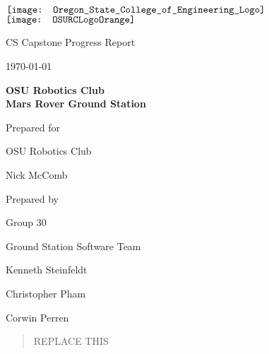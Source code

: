 \documentclass[onecolumn, draftclsnofoot, 10pt, compsoc]{IEEEtran}
\def \CapstoneTeamName{			Ground Station Software Team}
\def \CapstoneTeamNumber{		30}
\def \GroupMemberOne{			Kenneth Steinfeldt}
\def \GroupMemberTwo{			Christopher Pham}
\def \GroupMemberThree{			Corwin Perren}
\def \CapstoneProjectName{		OSU Robotics Club\\Mars Rover Ground Station}
\def \CapstoneSponsorCompany{	OSU Robotics Club}
\def \CapstoneSponsorPerson{	Nick McComb}
\def \DocType{	%
				Progress Report
			 }
\newcommand{\NameSigPair}[1]{
  \par
  \makebox[2.75in][r]{#1} 
  \hfill
  \makebox[3.25in]{
      \makebox[2.25in]{\hrulefill} 
      \hfill
      \makebox[.75in]{\hrulefill}
  }
  \par\vspace{-12pt} 
  \textit{
      \tiny\noindent
      \makebox[2.75in]{} 
      \hfill
      \makebox[3.25in]{
          \makebox[2.25in][r]{Signature} 
          \hfill
          \makebox[.75in][r]{Date}
      }
  }
}
\renewcommand{\NameSigPair}[1]{#1}
\begin{document}
\begin{titlepage}
	\begin{singlespace}
        \begin{minipage}{7in}
			\centering
			\hspace*{-.7in}
			$\vcenter{\hbox{\texttt{[image: Oregon\_State\_College\_of\_Engineering\_Logo]}}}$
			\hspace*{.2in}
			$\vcenter{\hbox{\texttt{[image: OSURCLogoOrange]}}}$
		\end{minipage}

		\par\vspace{.35in}
		\centering
		\scshape{
			\huge CS Capstone \DocType \par
			{\large\today}\par
			\vspace{.5in}
			\textbf{\Huge\CapstoneProjectName}\par
			\vfill
			{\large Prepared for}\par
			\Huge \CapstoneSponsorCompany\par
			\vspace{5pt}
			{\Large\NameSigPair{\CapstoneSponsorPerson}\par}
			{\large Prepared by }\par
			Group\CapstoneTeamNumber\par
			\CapstoneTeamName\par 
			\vspace{5pt}
			{\Large
				\NameSigPair{\GroupMemberOne}\par
				\NameSigPair{\GroupMemberTwo}\par
				\NameSigPair{\GroupMemberThree}\par
			}
			\vspace{20pt}
            \begin{abstract}
			REPLACE THIS

		\end{abstract}
		}
	\end{singlespace}
\end{titlepage}
\newpage
{}
\tableofcontents
\clearpage







\end{document}
